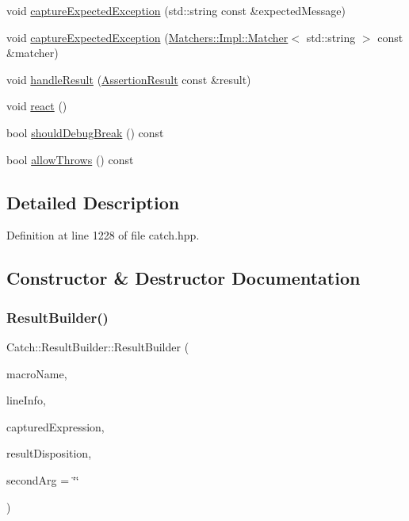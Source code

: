 \begin{DoxyCompactItemize}
void \hyperlink{class_catch_1_1_result_builder_a9ac96f6220c8dd8e4feee725c6228d77}{capture\+Expected\+Exception} (std\+::string const \&expected\+Message)
\item 
void \hyperlink{class_catch_1_1_result_builder_a7d443d632eaeabe2cb36218b8dcb7400}{capture\+Expected\+Exception} (\hyperlink{struct_catch_1_1_matchers_1_1_impl_1_1_matcher}{Matchers\+::\+Impl\+::\+Matcher}$<$ std\+::string $>$ const \&matcher)
\item 
void \hyperlink{class_catch_1_1_result_builder_ad8bb17e4ac590b75bf8630d8f3502f4e}{handle\+Result} (\hyperlink{class_catch_1_1_assertion_result}{Assertion\+Result} const \&result)
\item 
void \hyperlink{class_catch_1_1_result_builder_a3085cdc46533d45bed6f652a2ac295c0}{react} ()
\item 
bool \hyperlink{class_catch_1_1_result_builder_a6f2b0dbcc6cc5e0a500ac45f2534e3e7}{should\+Debug\+Break} () const
\item 
bool \hyperlink{class_catch_1_1_result_builder_a0428fd78ab9e8e6f1aca6855f20fc715}{allow\+Throws} () const
\end{DoxyCompactItemize}


\subsection{Detailed Description}


Definition at line 1228 of file catch.\+hpp.



\subsection{Constructor \& Destructor Documentation}
\hypertarget{class_catch_1_1_result_builder_a8579c3056f64f9324cf1181532828376}{}\label{class_catch_1_1_result_builder_a8579c3056f64f9324cf1181532828376} 
\subsubsection{\texorpdfstring{Result\+Builder()}{ResultBuilder()}}
{\footnotesize\ttfamily Catch\+::\+Result\+Builder\+::\+Result\+Builder (\begin{DoxyParamCaption}\item[{char const $\ast$}]{macro\+Name,  }\item[{\hyperlink{struct_catch_1_1_source_line_info}{Source\+Line\+Info} const \&}]{line\+Info,  }\item[{char const $\ast$}]{captured\+Expression,  }\item[{\hyperlink{struct_catch_1_1_result_disposition_a3396cad6e2259af326b3aae93e23e9d8}{Result\+Disposition\+::\+Flags}}]{result\+Disposition,  }\item[{char const $\ast$}]{second\+Arg = {\ttfamily \char`\"{}\char`\"{}} }\end{DoxyParamCaption})}



